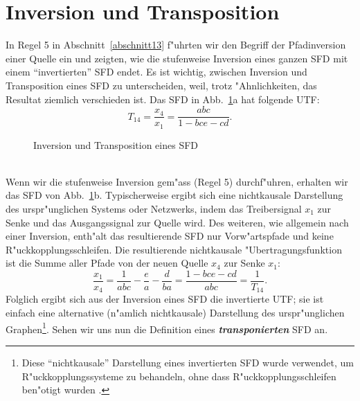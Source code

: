 \section{Inversion und Transposition} In Regel 5 in
Abschnitt~\ref{abschnitt13} f"uhrten wir den Begriff der Pfadinversion
einer Quelle ein und zeigten, wie die stufenweise Inversion eines
ganzen SFD mit einem ``invertierten'' SFD endet. Es ist wichtig,
zwischen Inversion und Transposition eines SFD zu unterscheiden, weil,
trotz "Ahnlichkeiten, das Resultat ziemlich verschieden ist. Das SFD
in Abb.~\ref{SFD37}a hat folgende UTF:
\begin{equation}
 T_{14} = \frac{x_4}{x_1} = \frac{abc}{1-bce-cd}.\label{mathSFD37}
\end{equation}
\begin{figure}[htb!]
\vspace*{-7mm}\begin{center}
  \caption{Inversion und Transposition eines SFD}\label{SFD37}
\end{center}
\vspace*{-7mm}
\end{figure}\\
\nit Wenn wir die stufenweise Inversion gem"ass (Regel 5) durchf"uhren,
erhalten wir das SFD von Abb.~\ref{SFD37}b.  Typischerweise ergibt
sich eine nichtkausale  Darstellung des
urspr"unglichen Systems oder Netzwerks, indem das Treibersignal $x_1$
zur Senke und das Ausgangssignal zur Quelle
wird.  Des weiteren, wie allgemein nach einer Inversion, enth"alt das
resultierende SFD nur Vorw"artspfade und keine
R"uckkopplungsschleifen. Die resultierende nichtkausale
"Ubertragungsfunktion ist die Summe aller Pfade von der neuen Quelle
$x_4$ zur Senke $x_1$:\\
\begin{equation*}
 \frac{x_1}{x_4} = \frac{1}{abc} - \frac{e}{a} - \frac{d}{ba} = \frac{1-bce-cd}{abc} = \frac{1}{T_{14}}.
\end{equation*}
\nit Folglich ergibt sich aus der Inversion eines SFD die invertierte
UTF; sie ist einfach eine alternative (n"amlich nichtkausale)
Darstellung des urspr"unglichen Graphen\footnote{Diese
  ``nichtkausale'' Darstellung eines invertierten SFD wurde verwendet,
  um R"uckkopplungssysteme zu behandeln, ohne dass
  R"uckkopplungsschleifen ben"otigt wurden \cite{WAL:82}.}.  Sehen wir
uns nun die Definition eines
\textbf{\emph{transponierten}} SFD an.
